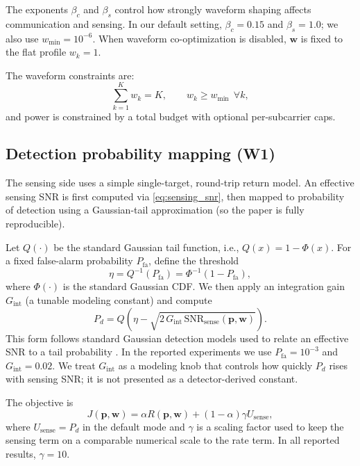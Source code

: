 \documentclass[runningheads]{llncs}
\begin{document}
The exponents $\beta_c$ and $\beta_s$ control how strongly waveform shaping affects communication and sensing. In our default setting, $\beta_c=0.15$ and $\beta_s=1.0$; we also use $w_{\min}=10^{-6}$. When waveform co-optimization is disabled, $\mathbf{w}$ is fixed to the flat profile $w_k=1$.

The waveform constraints are:
\begin{equation}
\sum_{k=1}^{K} w_k = K,\qquad w_k \ge w_{\min}\ \ \forall k,
\end{equation}
and power is constrained by a total budget with optional per-subcarrier caps.

\subsection{Detection probability mapping (W1)}
The sensing side uses a simple single-target, round-trip return model. An effective sensing SNR is first computed via \eqref{eq:sensing_snr}, then mapped to probability of detection using a Gaussian-tail approximation (so the paper is fully reproducible).

Let $Q(\cdot)$ be the standard Gaussian tail function, i.e., $Q(x)=1-\Phi(x)$. For a fixed false-alarm probability $P_{\mathrm{fa}}$, define the threshold
\begin{equation}
\eta = Q^{-1}(P_{\mathrm{fa}}) = \Phi^{-1}(1-P_{\mathrm{fa}}),
\end{equation}
where $\Phi(\cdot)$ is the standard Gaussian CDF.
We then apply an integration gain $G_{\mathrm{int}}$ (a tunable modeling constant) and compute
\begin{equation}
P_d = Q\!\left(\eta - \sqrt{2\,G_{\mathrm{int}}\,\mathrm{SNR}_{\mathrm{sense}}(\mathbf{p},\mathbf{w})}\right).
\label{eq:pd_mapping}
\end{equation}
This form follows standard Gaussian detection models used to relate an effective SNR to a tail probability \cite{kay_detection,richards_radar}. In the reported experiments we use $P_{\mathrm{fa}}=10^{-3}$ and $G_{\mathrm{int}}=0.02$. We treat $G_{\mathrm{int}}$ as a modeling knob that controls how quickly $P_d$ rises with sensing SNR; it is not presented as a detector-derived constant.

The objective is
\begin{equation}
J(\mathbf{p}, \mathbf{w}) = \alpha R(\mathbf{p}, \mathbf{w}) + (1-\alpha)\gamma U_{\mathrm{sense}},
\end{equation}
where $U_{\mathrm{sense}} = P_d$ in the default mode and $\gamma$ is a scaling factor used to keep the sensing term on a comparable numerical scale to the rate term. In all reported results, $\gamma=10$.
\end{document}
